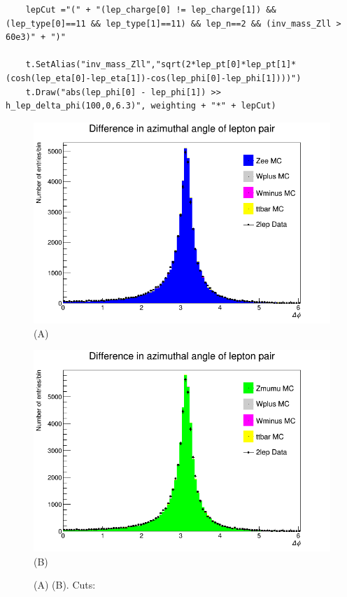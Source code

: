 \begin{lstlisting}
    lepCut ="(" + "(lep_charge[0] != lep_charge[1]) && (lep_type[0]==11 && lep_type[1]==11) && lep_n==2 && (inv_mass_Zll > 60e3)" + ")"
    
    t.SetAlias("inv_mass_Zll","sqrt(2*lep_pt[0]*lep_pt[1]*(cosh(lep_eta[0]-lep_eta[1])-cos(lep_phi[0]-lep_phi[1])))")
    t.Draw("abs(lep_phi[0] - lep_phi[1]) >> h_lep_delta_phi(100,0,6.3)", weighting + "*" + lepCut)
\end{lstlisting}

\begin{figure}[h!]
    \centering
    \begin{minipage}{0.5\textwidth}
        \centering
        \includegraphics[width=\linewidth]{plots/25-02-2021/Zee-Stack-delta phi_(inv--mass-cut-lower-60GeV_2lep=ee)_25-02-21_09-30.png}
        (A)
    \end{minipage}\hfill
    \begin{minipage}{0.5\textwidth}
        \centering
        \includegraphics[width=\linewidth]{plots/25-02-2021/Zmumu-Stack-delta phi_(inv--mass-cut-lower-60GeV_2lep=mumu)_25-02-21_09-40.png}
        (B)
    \end{minipage}
    \caption{(A) (B).  Cuts: }
    \label{fig:}
\end{figure}

